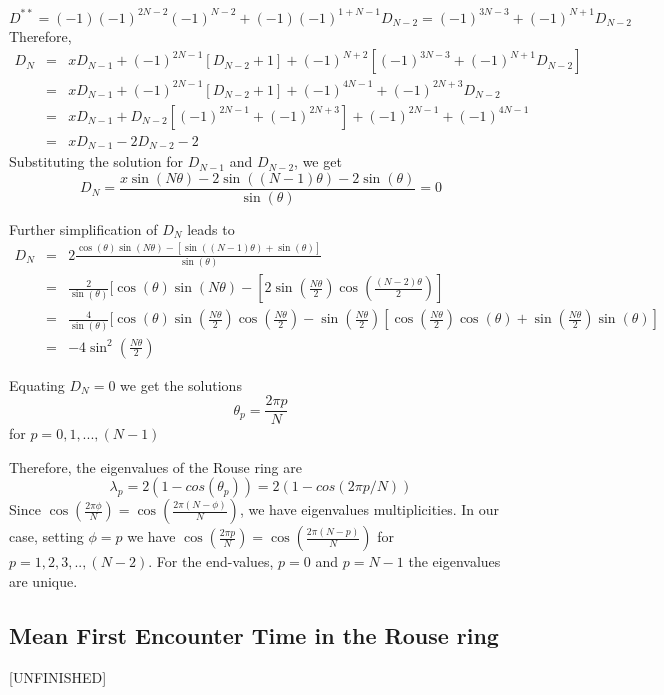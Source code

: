 \documentclass{report}
\begin{document}
\begin{equation*}
D^{**}=(-1)(-1)^{2N-2}(-1)^{N-2} +(-1)(-1)^{1+N-1}D_{N-2}=(-1)^{3N-3}+(-1)^{N+1}D_{N-2}
\end{equation*}
Therefore, 
\begin{eqnarray*}
D_N & = & xD_{N-1} + (-1)^{2N-1}[D_{N-2}+1]+(-1)^{N+2}[(-1)^{3N-3}+(-1)^{N+1}D_{N-2}]\\
    & = & xD_{N-1} + (-1)^{2N-1}[D_{N-2}+1]+(-1)^{4N-1}+(-1)^{2N+3}D_{N-2}\\
    & = & xD_{N-1} + D_{N-2}[(-1)^{2N-1}+(-1)^{2N+3}]+(-1)^{2N-1}+(-1)^{4N-1}\\
    & = & xD_{N-1} - 2D_{N-2}-2
\end{eqnarray*}
Substituting the solution for $D_{N-1}$ and $D_{N-2}$, we get 
\begin{equation*}
D_N = \frac{x\sin(N\theta)-2\sin((N-1)\theta)-2\sin(\theta)}{\sin(\theta)}=0
\end{equation*}

Further simplification of $D_N$ leads to 
\begin{eqnarray*}
D_N &=& 2\frac{\cos(\theta)\sin(N\theta)-[\sin((N-1)\theta)+\sin(\theta)]}{\sin(\theta)}\\
    &=& \frac{2}{\sin(\theta)}[\cos(\theta)\sin(N\theta)-[2\sin(\frac{N\theta}{2})\cos(\frac{(N-2)\theta}{2})]\\
    &=& \frac{4}{\sin(\theta)}[\cos(\theta)\sin(\frac{N\theta}{2})\cos(\frac{N\theta}{2})-\sin(\frac{N\theta}{2})[\cos(\frac{N\theta}{2})\cos(\theta)+\sin(\frac{N\theta}{2})\sin(\theta)]\\
    &=& -4\sin^2(\frac{N\theta}{2})
\end{eqnarray*}

Equating $D_N=0$ we get the solutions
\begin{equation*}
\theta_p=\frac{2\pi p}{N}
\end{equation*}
for $p=0,1,...,(N-1)$

Therefore, the eigenvalues of the Rouse ring are 
\begin{equation*}
\lambda_p=2(1-cos(\theta_p))= 2(1-cos(2\pi p/N))
\end{equation*}
Since $\cos(\frac{2\pi \phi}{N})=\cos(\frac{2\pi(N-\phi)}{N})$, we have eigenvalues multiplicities. In our case, setting $\phi=p$ we have $\cos(\frac{2\pi p}{N})=\cos(\frac{2\pi(N-p)}{N})$ for $p=1,2,3,..,(N-2)$. For the end-values, $p=0$ and $p=N-1$ the eigenvalues are unique. 

\subsection{Mean First Encounter Time in the Rouse ring}\label{subsection_meanFirstEncounterTimeInTheRouseRing}
[UNFINISHED]
\end{document}
